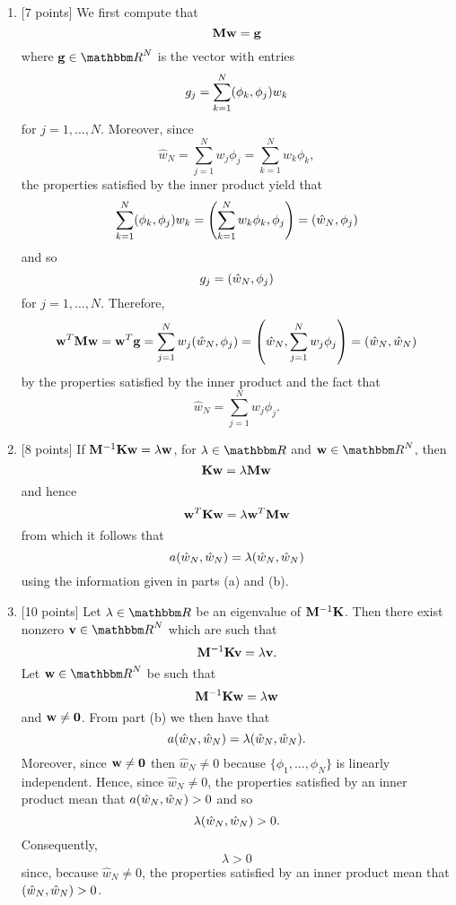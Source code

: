 \begin{solution}
\begin{enumerate}
\item {[7 points]} We first compute that
\[
{\bf M}{\bf w}={\bf g}
\]
where $\Bg\in\R^{N}$ is the vector with entries
\[
g_j=\sum_{k=1}^N(\phi_k,\phi_j)w_k
\]
for $j=1,\ldots,N$. Moreover, since
\[
\hat{w}_N=\sum_{j=1}^Nw_j\phi_j=\sum_{k=1}^Nw_k\phi_k,
\]
the properties satisfied by the inner product yield that
\[
\sum_{k=1}^N(\phi_k,\phi_j)w_k=\left(\sum_{k=1}^Nw_k\phi_k,\phi_j\right)=(\hat{w}_N,\phi_j)
\]
and so
\[
g_j=(\hat{w}_N,\phi_j)
\]
for $j=1,\ldots,N$. Therefore,
\[
{\bf w}^T{\bf M}{\bf w}={\bf w}^T{\bf g}=\sum_{j=1}^Nw_j(\hat{w}_N,\phi_j)=\left(\hat{w}_N,\sum_{j=1}^Nw_j\phi_j\right)=(\hat{w}_N,\hat{w}_N)
\]
by the properties satisfied by the inner product and the fact that
\[
\hat{w}_N=\sum_{j=1}^Nw_j\phi_j.
\]

\item {[8 points]} If ${\bf M}^{-1}{\bf K}{\bf w}=\lambda{\bf w}$, for $\lambda\in\R$ and $\Bw\in\R^N$, then
\[
{\bf K}{\bf w}=\lambda{\bf M}{\bf w}
\]
and hence
\[
{\bf w}^T{\bf K}{\bf w}=\lambda{\bf w}^T{\bf M}{\bf w}
\]
from which it follows that
\[
a(\hat{w}_N,\hat{w}_N)=\lambda(\hat{w}_N,\hat{w}_N)
\]
using the information given in parts (a) and (b).

\item {[10 points]} Let $\lambda\in\R$ be an eigenvalue of ${\bf M}^{-1}{\bf K}$. Then there exist nonzero $\Bv\in\R^N$ which are such that
\[
{\bf M}^{-1}{\bf K}{\bf v}=\lambda{\bf v}.
\]
Let $\Bw\in\R^N$ be such that
\[
{\bf M}^{-1}{\bf K}{\bf w}=\lambda{\bf w}
\]
and ${\bf w}\ne{\bf 0}$. From part (b) we then have that
\[
a(\hat{w}_N,\hat{w}_N)=\lambda(\hat{w}_N,\hat{w}_N).
\]
Moreover, since ${\bf w}\ne{\bf 0}$ then $\hat{w}_N\ne 0$ because $\{\phi_1,...,\phi_N\}$ is linearly independent. Hence, since $\hat{w}_N\ne 0$, the properties satisfied by an inner product mean that $a(\hat{w}_N,\hat{w}_N)>0$ and so
\[
\lambda(\hat{w}_N,\hat{w}_N)>0.
\]
Consequently, 
\[
\lambda>0
\]
since, because $\hat{w}_N\ne 0$, the properties satisfied by an inner product mean that $(\hat{w}_N,\hat{w}_N)>0$.


\end{enumerate}
\end{solution}